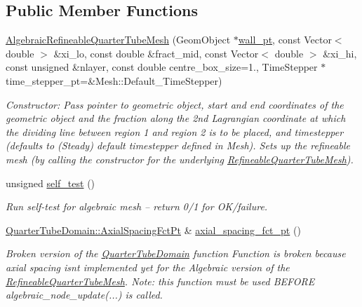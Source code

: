\subsection*{Public Member Functions}
\begin{DoxyCompactItemize}
\item 
\hyperlink{classoomph_1_1AlgebraicRefineableQuarterTubeMesh_ad8ff9f32d4d180d815da65ddc3c4b90a}{Algebraic\+Refineable\+Quarter\+Tube\+Mesh} (Geom\+Object $\ast$\hyperlink{classoomph_1_1QuarterTubeMesh_af59c4cde343ddd76caea4bc8c8ad8b94}{wall\+\_\+pt}, const Vector$<$ double $>$ \&xi\+\_\+lo, const double \&fract\+\_\+mid, const Vector$<$ double $>$ \&xi\+\_\+hi, const unsigned \&nlayer, const double centre\+\_\+box\+\_\+size=1., Time\+Stepper $\ast$time\+\_\+stepper\+\_\+pt=\&Mesh\+::\+Default\+\_\+\+Time\+Stepper)
\begin{DoxyCompactList}\small\item\em Constructor\+: Pass pointer to geometric object, start and end coordinates of the geometric object and the fraction along the 2nd Lagrangian coordinate at which the dividing line between region 1 and region 2 is to be placed, and timestepper (defaults to (Steady) default timestepper defined in Mesh). Sets up the refineable mesh (by calling the constructor for the underlying \hyperlink{classoomph_1_1RefineableQuarterTubeMesh}{Refineable\+Quarter\+Tube\+Mesh}). \end{DoxyCompactList}\item 
unsigned \hyperlink{classoomph_1_1AlgebraicRefineableQuarterTubeMesh_a1ad71be8274f4073b7e18cb53d574f10}{self\+\_\+test} ()
\begin{DoxyCompactList}\small\item\em Run self-\/test for algebraic mesh -- return 0/1 for O\+K/failure. \end{DoxyCompactList}\item 
\hyperlink{classoomph_1_1QuarterTubeDomain_ae347af42a5dcb9b3b82c2247975b01db}{Quarter\+Tube\+Domain\+::\+Axial\+Spacing\+Fct\+Pt} \& \hyperlink{classoomph_1_1AlgebraicRefineableQuarterTubeMesh_ac6518f83dd81c5ef1a8d908be8c9f473}{axial\+\_\+spacing\+\_\+fct\+\_\+pt} ()
\begin{DoxyCompactList}\small\item\em Broken version of the \hyperlink{classoomph_1_1QuarterTubeDomain}{Quarter\+Tube\+Domain} function Function is broken because axial spacing isn\textquotesingle{}t implemented yet for the Algebraic version of the \hyperlink{classoomph_1_1RefineableQuarterTubeMesh}{Refineable\+Quarter\+Tube\+Mesh}. Note\+: this function must be used B\+E\+F\+O\+RE algebraic\+\_\+node\+\_\+update(...) is called. \end{DoxyCompactList}\item 

\end{DoxyCompactItemize}

